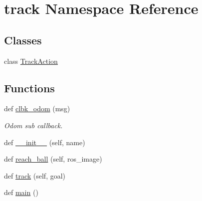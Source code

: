 \hypertarget{namespacetrack}{}\section{track Namespace Reference}
\label{namespacetrack}
\subsection*{Classes}
\begin{DoxyCompactItemize}
\item 
class \hyperlink{classtrack_1_1TrackAction}{Track\+Action}
\end{DoxyCompactItemize}
\subsection*{Functions}
\begin{DoxyCompactItemize}
\item 
def \hyperlink{namespacetrack_ac547a00259cf9bddfb37b60063740e8d}{clbk\+\_\+odom} (msg)
\begin{DoxyCompactList}\small\item\em Odom sub callback. \end{DoxyCompactList}\item 
def \hyperlink{namespacetrack_a49b5b58ad2366084e3f134c4175ec6cd}{\+\_\+\+\_\+init\+\_\+\+\_\+} (self, name)
\item 
def \hyperlink{namespacetrack_a474e47f2349d891970c4a7d004010f27}{reach\+\_\+ball} (self, ros\+\_\+image)
\item 
def \hyperlink{namespacetrack_a7224b28ef3155cf9597b97efe6411490}{track} (self, goal)
\item 
def \hyperlink{namespacetrack_a30188f067a9106a2f3e2ecedfd9cc52a}{main} ()
\end{DoxyCompactItemize}
